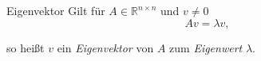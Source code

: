 
\begin{flashcard}[Definition]{Eigenvektor}
Gilt für $A \in \mathbb{R}^{n \times n}$ und $v \neq 0$
$$
	A v = \lambda v,
$$

so heißt $v$ ein \emph{Eigenvektor} von $A$ zum \emph{Eigenwert} $\lambda$. 
\end{flashcard}
